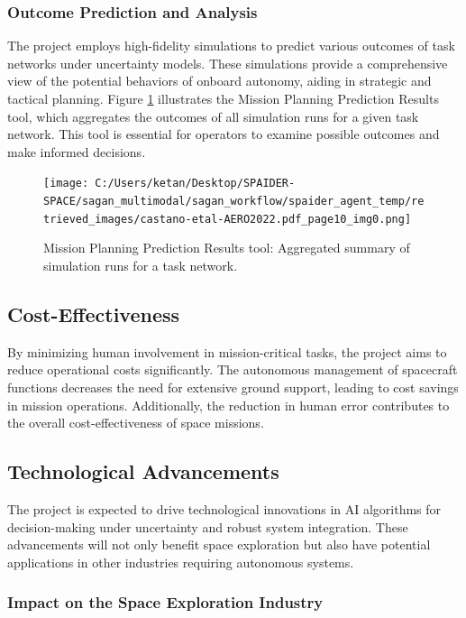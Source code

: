 \documentclass[a4paper, 11pt]{article}
\begin{document}
\subsubsection{Outcome Prediction and Analysis}

The project employs high-fidelity simulations to predict various outcomes of task networks under uncertainty models. These simulations provide a comprehensive view of the potential behaviors of onboard autonomy, aiding in strategic and tactical planning. Figure \ref{fig:mission-planning-tool} illustrates the Mission Planning Prediction Results tool, which aggregates the outcomes of all simulation runs for a given task network. This tool is essential for operators to examine possible outcomes and make informed decisions.

\begin{figure}[htbp]
    \centering
    \texttt{[image: C:/Users/ketan/Desktop/SPAIDER-SPACE/sagan\_multimodal/sagan\_workflow/spaider\_agent\_temp/retrieved\_images/castano-etal-AERO2022.pdf\_page10\_img0.png]}
    \caption{Mission Planning Prediction Results tool: Aggregated summary of simulation runs for a task network.}
    \label{fig:mission-planning-tool}
\end{figure}

\subsection{Cost-Effectiveness}

By minimizing human involvement in mission-critical tasks, the project aims to reduce operational costs significantly. The autonomous management of spacecraft functions decreases the need for extensive ground support, leading to cost savings in mission operations. Additionally, the reduction in human error contributes to the overall cost-effectiveness of space missions.

\subsection{Technological Advancements}

The project is expected to drive technological innovations in AI algorithms for decision-making under uncertainty and robust system integration. These advancements will not only benefit space exploration but also have potential applications in other industries requiring autonomous systems.

\subsubsection{Impact on the Space Exploration Industry}
\end{document}
